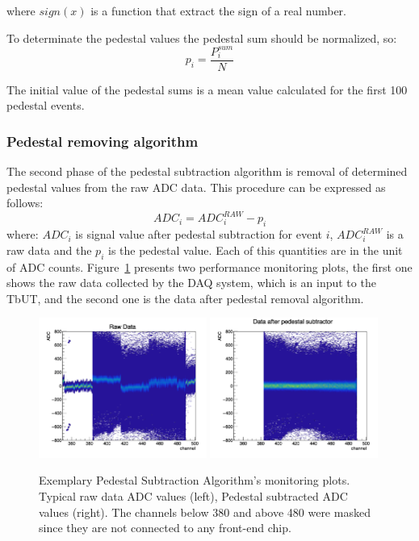 where $sign(x)$ is a function that extract the sign of a real number. 

To determinate the pedestal values the pedestal sum should be normalized, so:
\begin{equation}
p_{i}=\frac{P^{sum}_{i}}{N}
\end{equation}

The initial value of the pedestal sums is a mean value calculated for the first 100 pedestal events. 

\subsubsection{Pedestal removing algorithm}
The second phase of the pedestal subtraction algorithm is removal of determined pedestal values from the raw ADC data. This procedure can be expressed as follows:
\begin{equation}
ADC_{i}=ADC^{RAW}_{i}-p_{i}
\end{equation} 
where: $ADC_{i}$ is signal value after pedestal subtraction for event $i$, $ADC^{RAW}_{i}$ is a raw data and the $p_{i}$ is the pedestal value. Each of this quantities are in the unit of ADC counts. 
Figure~\ref{fig:raw vs ped} presents two performance monitoring plots, the first one shows the raw data collected by the DAQ system, which is an input to the TbUT, and the second one is the data after pedestal removal algorithm.  

\begin{figure}[tbph]
\begin{center}
\includegraphics[width = 0.49\textwidth]{figures/raw_data.png} 
\includegraphics[width = 0.49\textwidth]{figures/pedestal_data.png}
\caption{Exemplary Pedestal Subtraction Algorithm's monitoring plots. Typical raw data ADC values (left), Pedestal subtracted ADC values
(right). The channels below 380 and above 480 were masked since they are not connected to any front-end chip.} 
\label{fig:raw vs ped}
 \end{center}
\end{figure}


